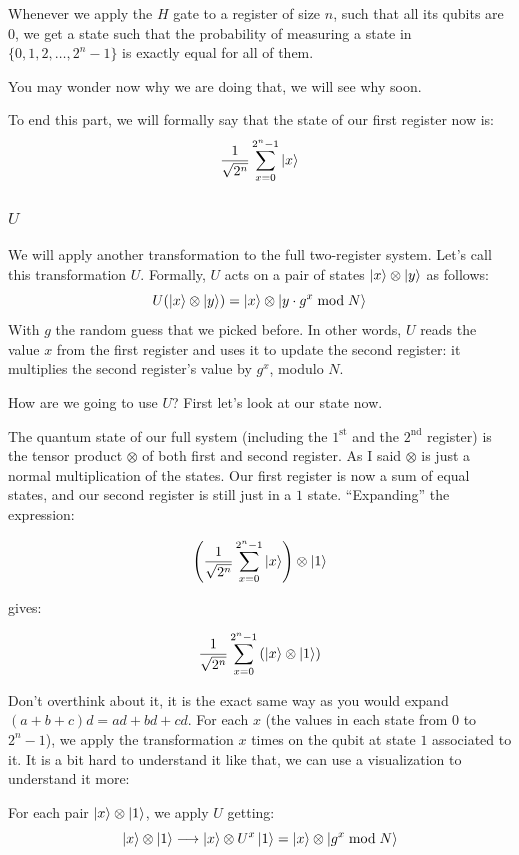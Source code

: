 Whenever we apply the $H$ gate to a register of size $n$, such that all its
qubits are $0$, we get a state such that the probability of measuring a state
in $\{0, 1, 2, \ldots, 2^n - 1\}$ is exactly equal for all of them.

You may wonder now why we are doing that, we will see why soon.

To end this part, we will formally say that the state of our first register
now is:
$$
\frac{1}{\sqrt{2^n}} \sum_{x=0}^{2^n - 1} \ket{x}
$$

\subsubsection{$U$}

We will apply another transformation to the full two-register system. Let's
call this transformation $U$. Formally, $U$ acts on a pair of states
$\ket{x} \otimes \ket{y}$ as follows:
$$
U(\ket{x} \otimes \ket{y}) = \ket{x} \otimes \ket{y \cdot g^x \bmod N}
$$
With $g$ the random guess that we picked before. In other words, $U$ reads the
value $x$ from the first register and uses it to update the second register:
it multiplies the second register's value by $g^x$, modulo $N$.

How are we going to use $U$? First let's look at our state now.

The quantum state of our full system (including the $1^\text{st}$ and the
$2^\text{nd}$ register) is the tensor product $\otimes$ of both first and
second register. As I said $\otimes$ is just a normal multiplication of the
states. Our first register is now a sum of equal states, and our second
register is still just in a $1$ state. ``Expanding'' the expression:

\[
\left( \frac{1}{\sqrt{2^n}} \sum_{x=0}^{2^n - 1} \ket{x} \right) \otimes \ket{1}
\]

gives:

\[
\frac{1}{\sqrt{2^n}} \sum_{x=0}^{2^n - 1} \left( \ket{x} \otimes \ket{1} \right)
\]

Don't overthink about it, it is the exact same way as you would expand
$(a + b + c)d = ad + bd + cd$.
For each $x$ (the values in each state from $0$ to $2^n - 1$), we apply the
transformation $x$ times on the qubit at state $1$ associated to it. It is a
bit hard to understand it like that, we can use a visualization to understand
it more:

For each pair $\ket{x} \otimes \ket{1}$, we apply $U$ getting:
$$
\ket{x} \otimes \ket{1} \longrightarrow \ket{x} \otimes U^x \ket{1}
= \ket{x} \otimes \ket{g^x \bmod N}
$$


